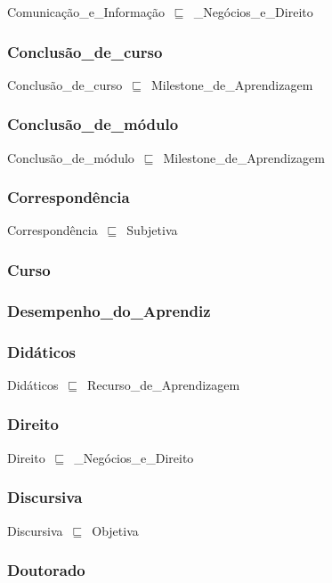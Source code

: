 \documentclass{article}
\begin{document}
Comunicação\_e\_Informação~\ensuremath{\sqsubseteq}~\_Negócios\_e\_Direito~

\subsubsection*{Conclusão\_de\_curso}

Conclusão\_de\_curso~\ensuremath{\sqsubseteq}~Milestone\_de\_Aprendizagem~

\subsubsection*{Conclusão\_de\_módulo}

Conclusão\_de\_módulo~\ensuremath{\sqsubseteq}~Milestone\_de\_Aprendizagem~

\subsubsection*{Correspondência}

Correspondência~\ensuremath{\sqsubseteq}~Subjetiva~

\subsubsection*{Curso}

\subsubsection*{Desempenho\_do\_Aprendiz}

\subsubsection*{Didáticos}

Didáticos~\ensuremath{\sqsubseteq}~Recurso\_de\_Aprendizagem~

\subsubsection*{Direito}

Direito~\ensuremath{\sqsubseteq}~\_Negócios\_e\_Direito~

\subsubsection*{Discursiva}

Discursiva~\ensuremath{\sqsubseteq}~Objetiva~

\subsubsection*{Doutorado}
\end{document}
